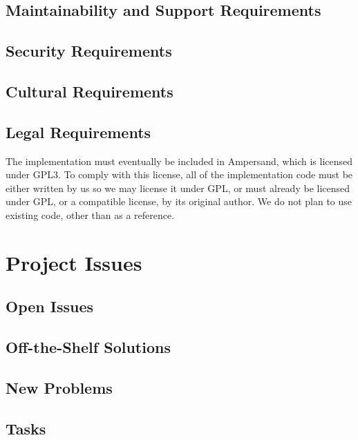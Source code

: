 \documentclass[12pt]{report}
\begin{document}
\section{Maintainability and Support Requirements}\label{sec:Support}
\section{Security Requirements}\label{sec:Security}
\section{Cultural Requirements}\label{sec:Cultural}
\section{Legal Requirements}\label{sec:Legal}
The implementation must eventually be included in Ampersand, which is licensed
under GPL3. To comply with this license, all of the implementation code must be
either written by us so we may license it under GPL, or must already be licensed
under GPL, or a compatible license, by its original author. We do not plan to
use existing code, other than as a reference.
%
%
\chapter{Project Issues}\label{ch:issues}
\section{Open Issues}\label{sec:issues}
\section{Off-the-Shelf Solutions}\label{sec:solutions}
\section{New Problems}\label{sec:NewProblems}
\section{Tasks}\label{sec:Tasks}
\end{document}
